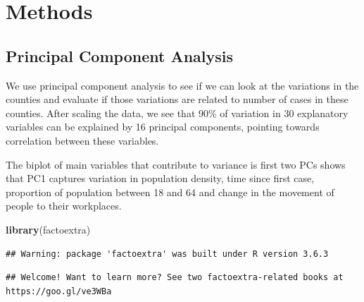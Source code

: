 \documentclass[
]{article}
\newenvironment{Shaded}{\begin{snugshade}}{\end{snugshade}}
\newcommand{\DataTypeTok}[1]{\textcolor[rgb]{0.13,0.29,0.53}{#1}}
\newcommand{\DecValTok}[1]{\textcolor[rgb]{0.00,0.00,0.81}{#1}}
\newcommand{\KeywordTok}[1]{\textcolor[rgb]{0.13,0.29,0.53}{\textbf{#1}}}
\newcommand{\NormalTok}[1]{#1}
\newcommand{\OperatorTok}[1]{\textcolor[rgb]{0.81,0.36,0.00}{\textbf{#1}}}
\newcommand{\OtherTok}[1]{\textcolor[rgb]{0.56,0.35,0.01}{#1}}
\newcommand{\StringTok}[1]{\textcolor[rgb]{0.31,0.60,0.02}{#1}}
\begin{document}
\hypertarget{methods}{%
\section{Methods}\label{methods}}

\hypertarget{principal-component-analysis}{%
\subsection{Principal Component
Analysis}\label{principal-component-analysis}}

We use principal component analysis to see if we can look at the
variations in the counties and evaluate if those variations are related
to number of cases in these counties. After scaling the data, we see
that 90\% of variation in 30 explanatory variables can be explained by
16 principal components, pointing towards correlation between these
variables.

The biplot of main variables that contribute to variance is first two
PCs shows that PC1 captures variation in population density, time since
first case, proportion of population between 18 and 64 and change in the
movement of people to their workplaces.

\begin{Shaded}
\begin{Highlighting}[]
\KeywordTok{library}\NormalTok{(factoextra)}
\end{Highlighting}
\end{Shaded}

\begin{verbatim}
## Warning: package 'factoextra' was built under R version 3.6.3
\end{verbatim}

\begin{verbatim}
## Welcome! Want to learn more? See two factoextra-related books at https://goo.gl/ve3WBa
\end{verbatim}

\begin{Shaded}
\end{Shaded}
\end{document}
